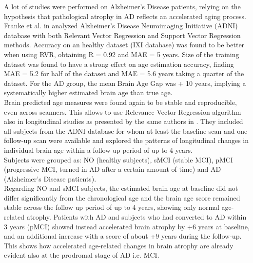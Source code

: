 \documentclass{article}
\begin{document}
	
	A lot of studies were performed on Alzheimer's Disease patients, relying on the hypothesis that pathological atrophy in AD reflects an accelerated aging process.
	\\
	Franke et al. in \cite{Franke2010} analyzed Alzheimer's Disease Neuroimaging Initiative (ADNI) database  with both Relevant Vector Regression and Support Vector Regression methods.
	Accuracy on an healthy dataset (IXI database) was found to be better when using RVR, obtaining R = 0.92 and MAE = 5 years. Size of the training dataset was found to have a strong effect on age estimation accuracy, finding MAE = 5.2 for half of the dataset and MAE = 5.6 years taking a quarter of the dataset. %
	For the AD group, the mean Brain Age Gap was + 10 years, implying a systematically higher estimated brain age than true age.
	\\ 
	Brain predicted age measures were found again to be stable and reproducible, even across scanners. This allows to use Relevance Vector Regression algorithm also in longitudinal studies as presented by the same authors in \cite{Franke2012}. %
	They included all subjects from the ADNI database for whom at least the baseline scan and one follow-up scan were available and explored the patterns of longitudinal changes in individual brain age within a follow-up period of up to 4 years.
	\\
	Subjects were grouped as: NO (healthy subjects), sMCI (stable MCI), pMCI (progressive MCI, turned in AD after a certain amount of time) and AD (Alzheimer's Disease patients).
	\\
	Regarding NO and sMCI subjects, the estimated brain age at baseline did not differ significantly from the chronological age and the brain age score remained stable across the follow up period of up to 4 years, showing only normal age-related atrophy. Patients with AD and subjects who had converted to AD within 3 years (pMCI) showed instead accelerated brain atrophy by +6 years at baseline, and an additional increase with a score of about +9 years during the follow-up. This shows how accelerated age-related changes in brain atrophy are already evident also at the prodromal stage of AD i.e. MCI.
\end{document}
